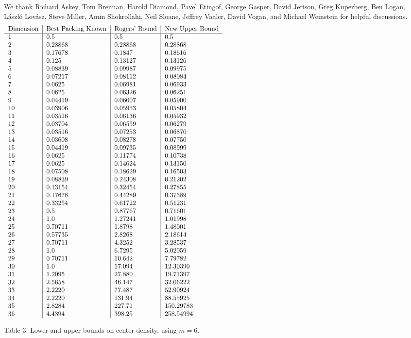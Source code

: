 We thank Richard Askey, Tom Brennan, Harold Diamond, Pavel
Etingof, George Gasper, David Jerison, Greg Kuperberg, Ben Logan,
L\'aszl\'o Lov\'asz, Steve Miller, Amin Shokrollahi, Neil Sloane,
Jeffrey Vaaler, David Vogan, and Michael Weinstein for helpful
discussions.\vfill
\eject
$$
\begin{tabular}{l|l|l|l}
Dimension & Best Packing Known &
Rogers' Bound & New Upper Bound\\
\hline
1&0.5     &0.5     &0.5\\
2&0.28868 &0.28868 &0.28868\\
3&0.17678 &0.1847  &0.18616\\
4&0.125   &0.13127 &0.13126\\
5&0.08839 &0.09987 &0.09975\\
6&0.07217 &0.08112 &0.08084\\
7&0.0625  &0.06981 &0.06933\\
8&0.0625  &0.06326 &0.06251\\
9&0.04419 &0.06007 &0.05900\\
10&0.03906 &0.05953 &0.05804\\
11&0.03516 &0.06136 &0.05932\\
12&0.03704 &0.06559 &0.06279\\
13&0.03516 &0.07253 &0.06870\\
14&0.03608 &0.08278 &0.07750\\
15&0.04419 &0.09735 &0.08999\\
16&0.0625  &0.11774 &0.10738\\
17&0.0625  &0.14624 &0.13150\\
18&0.07508 &0.18629 &0.16503\\
19&0.08839 &0.24308 &0.21202\\
20&0.13154 &0.32454 &0.27855\\
21&0.17678 &0.44289 &0.37389\\
22&0.33254 &0.61722 &0.51231\\
23&0.5     &0.87767 &0.71601\\
24&1.0   &1.27241 &1.01998\\
25&0.70711 &1.8798 &1.48001\\
26&0.57735 &2.8268 &2.18614\\
27&0.70711 &4.3252 &3.28537\\
28&1.0    &6.7295 &5.02059\\
29&0.70711 &10.642 &7.79782\\
30&1.0    &17.094 &12.30390\\
31&1.2095 &27.880 &19.71397\\
32&2.5658 &46.147 &32.06222\\
33&2.2220 &77.487 &52.90924\\
34&2.2220 &131.94 &88.55925\\
35&2.8284 &227.71 &150.29783\\
36&4.4394 &398.25 &258.54994\\
\end{tabular}
\begin{tabular}{c}\kern4in\end{tabular}
$$
\centerline{Table 3. Lower and upper bounds
on center density, using $m=6$.}


